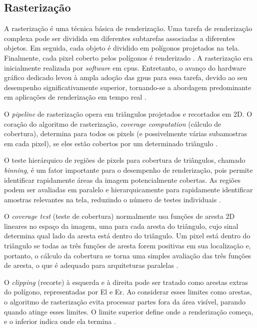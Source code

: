 \subsection{Rasterização}

A rasterização é uma técnica básica de renderização. Uma tarefa de renderização complexa pode ser dividida em diferentes subtarefas associadas a diferentes objetos. Em seguida, cada objeto é dividido em polígonos projetados na tela. Finalmente, cada pixel coberto pelos polígonos é renderizado \cite{wang2022development}. A rasterização era inicialmente realizada por \textit{software} em \glspl{cpu}. Entretanto, o avanço do hardware gráfico dedicado levou à ampla adoção das \glspl{gpu} para essa tarefa, devido ao seu desempenho significativamente superior, tornando-se a abordagem predominante em aplicações de renderização em tempo real \cite{laine2011high}.

O \textit{pipeline} de rasterização opera em triângulos projetados e recortados em 2D. O coração do algoritmo de rasterização, \textit{coverage computation} (cálculo de cobertura), determina para todos os pixels (e possivelmente várias subamostras em cada pixel), se eles estão cobertos por um determinado triângulo \cite{davidovivc20123d}.

O teste hierárquico de regiões de pixels para cobertura de triângulos, chamado \textit{binning}, é um fator importante para o desempenho de renderização, pois permite identificar rapidamente áreas da imagem potencialmente cobertas. As regiões podem ser avaliadas em paralelo e hierarquicamente para rapidamente identificar amostras relevantes na tela, reduzindo o número de testes individuais \cite{davidovivc20123d}.

O \textit{coverage test} (teste de cobertura) normalmente usa funções de aresta 2D lineares no espaço da imagem, uma para cada aresta do triângulo, cujo sinal determina qual lado da aresta está dentro do triângulo. Um pixel está dentro do triângulo se todas as três funções de aresta forem positivas em sua localização e, portanto, o cálculo da cobertura se torna uma simples avaliação das três funções de aresta, o que é adequado para arquiteturas paralelas \cite{davidovivc20123d}.

O \textit{clipping} (recorte) à esquerda e à direita pode ser tratado como arestas extras do polígono, representadas por El e Er. Ao considerar esses limites como arestas, o algoritmo de rasterização evita processar partes fora da área visível, parando quando atinge esses limites. O limite superior define onde a renderização começa, e o inferior indica onde ela termina \cite{pineda1988parallel}.

